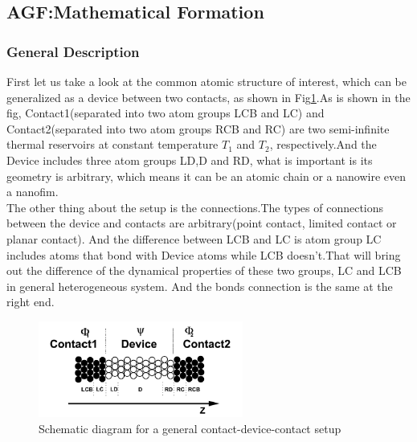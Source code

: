 \subsection{AGF:Mathematical Formation}
\subsubsection*{General Description}
 First let us take a look at the common atomic structure of interest, which can be generalized as a device between two contacts, as shown in Fig\ref{fig:contact}.As is shown in the fig, Contact1(separated into two atom groups LCB and LC) and Contact2(separated into two atom groups RCB and RC) are two semi-infinite thermal reservoirs at constant temperature $T_1$ and $T_2$, respectively.And the Device includes three atom groups LD,D and RD, what is important is its geometry is arbitrary, which means it can be an atomic chain or a nanowire even a nanofim.\\
\indent The other thing about the setup is the connections.The types of connections between the device and contacts are arbitrary(point contact, limited contact or planar contact). And the difference between LCB and LC is atom group LC includes atoms that bond with Device atoms while LCB doesn't.That will bring out the difference of the dynamical properties of these two groups, LC and LCB in general heterogeneous system. And the bonds connection is the same at the right end. 


\begin{figure}[htbp!] 
\centering    
\includegraphics[width=0.6\textwidth]{contact}
\caption[contact]{Schematic diagram for a general contact-device-contact setup\cite{ATF}}
\label{fig:contact}
\end{figure}

